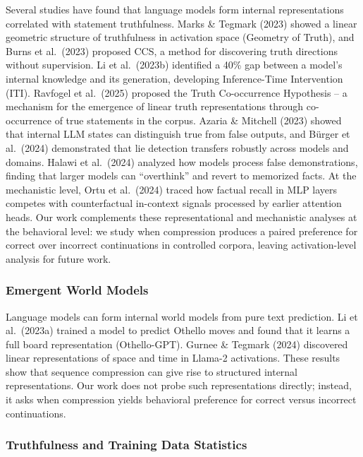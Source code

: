 \documentclass[
  11pt,
]{article}
\begin{document}
Several studies have found that language models form internal
representations correlated with statement truthfulness. Marks \& Tegmark
(2023) showed a linear geometric structure of truthfulness in activation
space (Geometry of Truth), and Burns et al.~(2023) proposed CCS, a
method for discovering truth directions without supervision. Li et
al.~(2023b) identified a 40\% gap between a model's internal knowledge
and its generation, developing Inference-Time Intervention (ITI).
Ravfogel et al.~(2025) proposed the Truth Co-occurrence Hypothesis -- a
mechanism for the emergence of linear truth representations through
co-occurrence of true statements in the corpus. Azaria \& Mitchell
(2023) showed that internal LLM states can distinguish true from false
outputs, and Bürger et al.~(2024) demonstrated that lie detection
transfers robustly across models and domains. Halawi et al.~(2024)
analyzed how models process false demonstrations, finding that larger
models can ``overthink'' and revert to memorized facts. At the
mechanistic level, Ortu et al.~(2024) traced how factual recall in MLP
layers competes with counterfactual in-context signals processed by
earlier attention heads. Our work complements these representational and
mechanistic analyses at the behavioral level: we study when compression
produces a paired preference for correct over incorrect continuations in
controlled corpora, leaving activation-level analysis for future work.

\subsubsection{Emergent World Models}\label{emergent-world-models}

Language models can form internal world models from pure text
prediction. Li et al.~(2023a) trained a model to predict Othello moves
and found that it learns a full board representation (Othello-GPT).
Gurnee \& Tegmark (2024) discovered linear representations of space and
time in Llama-2 activations. These results show that sequence
compression can give rise to structured internal representations. Our
work does not probe such representations directly; instead, it asks when
compression yields behavioral preference for correct versus incorrect
continuations.

\subsubsection{Truthfulness and Training Data
Statistics}\label{truthfulness-and-training-data-statistics}
\end{document}
